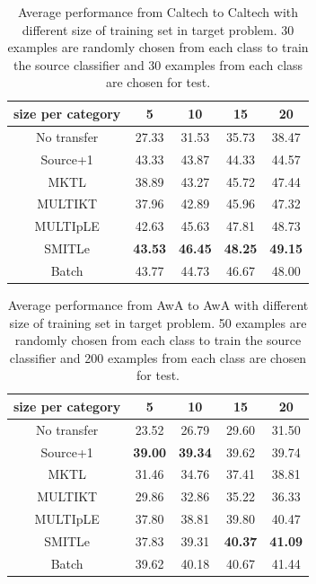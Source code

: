 \begin{table}[htbp]
  \centering
  \caption{Average performance from Caltech to Caltech with different size of training set in target problem. 30 examples are randomly chosen from each class to train the source classifier and 30 examples from each class are chosen for test. }
    \begin{tabular}{ccccc}
    \toprule
      size per category    & 5     & 10    & 15    & 20 \\
    \midrule
    No transfer &         27.33  &         31.53  &         35.73  &         38.47  \\
    Source+1    &         43.33  &         43.87   &         44.33  &         44.57   \\
    MKTL        &         38.89  &         43.27   &         45.72  &         47.44   \\
    MULTIKT     &         37.96  &         42.89   &         45.96  &         47.32  \\
    MULTIpLE    &         42.63  &         45.63   &         47.81  &         48.73 \\
    SMITLe        &         \textbf{43.53 }&         \textbf{46.45 } &         \textbf{48.25 } &         \textbf{49.15 } \\
        \midrule
    Batch       &         43.77  &         44.73   &         46.67  &         48.00 \\
    \bottomrule
    \end{tabular}%
  \label{tab:C2C}%
\end{table}%

\begin{table}[htbp]
  \centering
  \caption{Average performance from AwA to AwA with different size of training set in target problem. 50 examples are randomly chosen from each class to train the source classifier and 200 examples from each class are chosen for test.}
    \begin{tabular}{ccccc}
    \toprule
     size per category    & 5     & 10    & 15    & 20 \\
    \midrule
    No transfer &         23.52  &         26.79  &         29.60  &         31.50  \\
    Source+1    &         \textbf{39.00 } &         \textbf{39.34 } &         39.62 &         39.74  \\
    MKTL        &         31.46  &         34.76  &         37.41  &         38.81  \\
    MULTIKT     &         29.86  &         32.86  &         35.22  &         36.33  \\
    MULTIpLE    &         37.80  &         38.81  &         39.80  &         40.47  \\
    SMITLe        &        {37.83 } &         {39.31 } &         \textbf{40.37 } &         \textbf{41.09} \\
        \midrule
    Batch       &         39.62  &         40.18  &         40.67  &         41.44  \\
    \bottomrule
    \end{tabular}%
  \label{tab:A2A}%
\end{table}%



